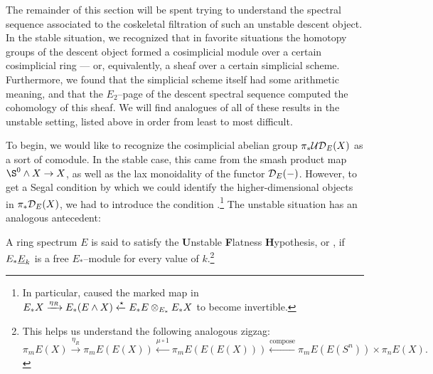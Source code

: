 The remainder of this section will be spent trying to understand the spectral sequence associated to the coskeletal filtration of such an unstable descent object.  In the stable situation, we recognized that in favorite situations the homotopy groups of the descent object formed a cosimplicial module over a certain cosimplicial ring --- or, equivalently, a sheaf over a certain simplicial scheme.  Furthermore, we found that the simplicial scheme itself had some arithmetic meaning, and that the $E_2$--page of the descent spectral sequence computed the cohomology of this sheaf.  We will find analogues of all of these results in the unstable setting, listed above in order from least to most difficult.

To begin, we would like to recognize the cosimplicial abelian group $\pi_* \mathcal{UD}_E(X)$ as a sort of comodule.  In the stable case, this came from the smash product map $\S^0 \sm X \to X$, as well as the lax monoidality of the functor $\mathcal{D}_E(-)$.  However, to get a Segal condition by which we could identify the higher-dimensional objects in $\pi_* \mathcal{D}_E(X)$, we had to introduce the condition {\FH}.\footnote{In particular, {\FH} caused the marked map in $E_* X \xrightarrow{\eta_R} E_*(E \wedge X) \xleftarrow{\star} E_* E \otimes_{E_*} E_* X$ to become invertible.}  The unstable situation has an analogous antecedent:

\begin{definition}
A ring spectrum $E$ is said to satisfy the \textbf{U}nstable \textbf{F}latness \textbf{H}ypothesis, or \UFH, if $E_* \underline{\smash{E}}_{k}$ is a free $E_*$--module for every value of $k$.\footnote{This helps us understand the following analogous zigzag: \[\pi_m E(X) \xrightarrow{\eta_R} \pi_m E(E(X)) \xleftarrow{\mu \circ 1} \pi_m E(E(E(X))) \xleftarrow{\mathrm{compose}} \pi_m E(E(S^n)) \times \pi_n E(X).\]}
\end{definition}

